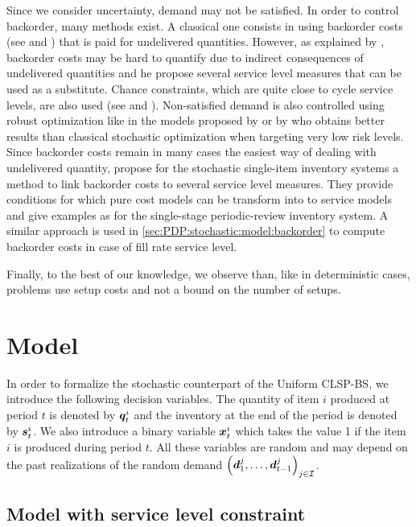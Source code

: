 Since we consider uncertainty, demand may not be satisfied.
In order to control backorder, many methods exist.
A classical one consists in using backorder costs (see \citet{Zangwill1969} and \citet{Absi2009}) that is paid for undelivered quantities.
However, as explained by \citet{Tempelmeier2013}, backorder costs may be hard to quantify due to indirect consequences of undelivered quantities and he propose several service level measures that can be used as a substitute.
Chance constraints, which are quite close to cycle service levels, are also used (see \citet{Tarim2004} and \citet{Gicquel2018}).
Non-satisfied demand is also controlled using robust optimization like in the models proposed by \citet{Gyulai2017} or by \citet{Minoux2018} who obtains better results than classical stochastic optimization when targeting very low risk levels.
Since backorder costs remain in many cases the easiest way of dealing with undelivered quantity, \citet{vanHoutum2000} propose for the stochastic single-item inventory systems a method to link backorder costs to several service level measures.
They provide conditions for which pure cost models can be transform into to service models and give examples as for the single-stage periodic-review inventory system.
A similar approach is used in \cref{sec:PDP:stochastic:model:backorder} to compute backorder costs in case of fill rate service level.


Finally, to the best of our knowledge, we observe than, like in deterministic cases, problems use setup costs and not a bound on the number of setups.


\section{Model}
\label{sec:PDP:stochastic:model}


In order to formalize the stochastic counterpart of the Uniform CLSP-BS, we introduce the following decision variables.
The quantity of item $i$ produced at period $t$ is denoted by $\va\quantity_t^i$ and the inventory at the end of the period is denoted by $\va\inventory_t^i$.
We also introduce a binary variable $\va\setup_t^i$ which takes the value 1 if the item $i$ is produced during period $t$.
All these variables are random and may depend on the past realizations of the random demand $\bracket{\va\demand_1^j,\ldots,\va\demand_{t-1}^j}_{j\in\REF}$.


\subsection{Model with service level constraint}


